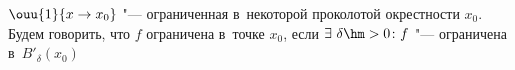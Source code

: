  \label{ot}   $\ouu{1}{x\to x_0}$ "--- ограниченная в~некоторой проколотой окрестности $x_0$.
    Будем говорить, что $f$ ограничена в~точке $x_0$, если $\exists\  \delta\hm>0\colon f$ "--- ограничена в~$B'_\delta(x_0)$

    